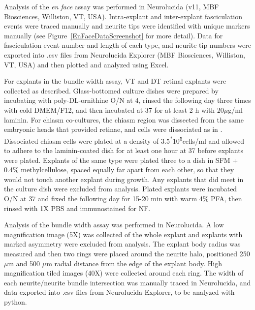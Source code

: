 Analysis of the \emph{en face} assay was performed in Neurolucida (v11, MBF Biosciences, Williston, VT, USA).
Intra-explant and inter-explant fasciculation events were traced manually and neurite tips were identified with unique markers manually (see Figure~\ref{EnFaceDataScreenshot} for more detail).
Data for fasciculation event number and length of each type, and neurite tip numbers were exported into .csv files from Neurolucida Explorer (MBF Biosciences, Williston, VT, USA) and then plotted and analyzed using Excel.

For explants in the bundle width assay, VT and DT retinal explants were collected as described.
Glass-bottomed culture dishes were prepared by incubating with poly-DL-ornithine O/N at 4\textcelsius, rinsed the following day three times with cold DMEM/F12, and then incubated at 37\textcelsius{} for at least 2 h with 20$\mu$g/ml laminin.
For chiasm co-cultures, the chiasm region was dissected from the same embryonic heads that provided retinae, and cells were dissociated as in .
Dissociated chiasm cells were plated at a density of 3.5\textsuperscript{*}10\textsuperscript{5}cells/ml and allowed to adhere to the laminin-coated dish for at least one hour at 37\textcelsius{} before explants were plated.
Explants of the same type were plated three to a dish in SFM + 0.4\% methylcellulose, spaced equally far apart from each other, so that they would not touch another explant during growth.
Any explants that did meet in the culture dish were excluded from analysis.
Plated explants were incubated O/N at 37\textcelsius{} and fixed the following day for 15-20 min with warm 4\% PFA, then rinsed with 1X PBS and immunostained for NF.

Analysis of the bundle width assay was performed in Neurolucida.
A low magnification image (5X) was collected of the whole explant and explants with marked asymmetry were excluded from analysis.
The explant body radius was measured and then two rings were placed around the neurite halo, positioned 250 $\mu$m and 500 $\mu$m radial distance from the edge of the explant body.
High magnification tiled images (40X) were collected around each ring.
The width of each neurite/neurite bundle intersection was manually traced in Neurolucida, and data exported into .csv files from Neurolucida Explorer, to be analyzed with python.

